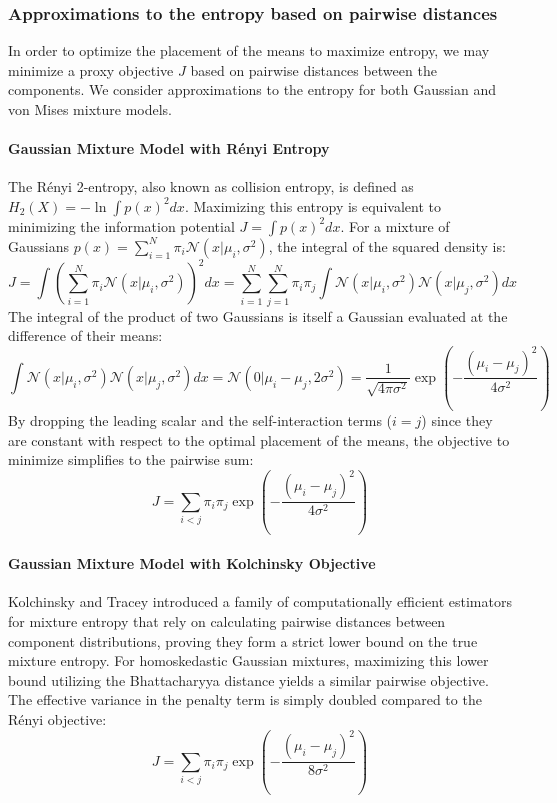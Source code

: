 
\subsubsection{Approximations to the entropy based on pairwise distances}

In order to optimize the placement of the means to maximize entropy, we may minimize a proxy objective $J$ based on pairwise distances between the components. We consider approximations to the entropy for both Gaussian and von Mises mixture models. 

\paragraph{Gaussian Mixture Model with Rényi Entropy}
The Rényi 2-entropy, also known as collision entropy, is defined as $H_2(X) = -\ln \int p(x)^2 dx$. Maximizing this entropy is equivalent to minimizing the information potential $J = \int p(x)^2 dx$.
For a mixture of Gaussians $p(x) = \sum_{i=1}^N \pi_i \mathcal{N}(x | \mu_i, \sigma^2)$, the integral of the squared density is:
$$ J = \int \left( \sum_{i=1}^N \pi_i \mathcal{N}(x | \mu_i, \sigma^2) \right)^2 dx = \sum_{i=1}^N \sum_{j=1}^N \pi_i \pi_j \int \mathcal{N}(x | \mu_i, \sigma^2) \mathcal{N}(x | \mu_j, \sigma^2) dx $$
The integral of the product of two Gaussians is itself a Gaussian evaluated at the difference of their means:
$$ \int \mathcal{N}(x | \mu_i, \sigma^2) \mathcal{N}(x | \mu_j, \sigma^2) dx = \mathcal{N}(0 | \mu_i - \mu_j, 2\sigma^2) = \frac{1}{\sqrt{4\pi\sigma^2}} \exp\left( - \frac{(\mu_i - \mu_j)^2}{4\sigma^2} \right) $$
By dropping the leading scalar and the self-interaction terms ($i=j$) since they are constant with respect to the optimal placement of the means, the objective to minimize simplifies to the pairwise sum:
$$ J = \sum_{i < j} \pi_i \pi_j \exp\left( - \frac{(\mu_i - \mu_j)^2}{4\sigma^2} \right) $$

\paragraph{Gaussian Mixture Model with Kolchinsky Objective}
Kolchinsky and Tracey \cite{Kolchinsky_2017} introduced a family of computationally efficient estimators for mixture entropy that rely on calculating pairwise distances between component distributions, proving they form a strict lower bound on the true mixture entropy.
For homoskedastic Gaussian mixtures, maximizing this lower bound utilizing the Bhattacharyya distance yields a similar pairwise objective. The effective variance in the penalty term is simply doubled compared to the Rényi objective:
$$ J = \sum_{i < j} \pi_i \pi_j \exp\left( - \frac{(\mu_i - \mu_j)^2}{8\sigma^2} \right) $$

